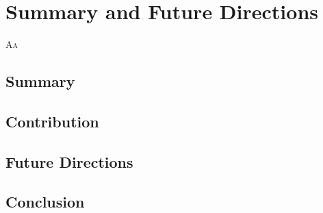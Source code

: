 
\chapter{\color{red}Summary and Future Directions}

\lettrine{A}{a}

\section{\color{red}Summary}


\section{\color{red}Contribution}


\section{\color{red}Future Directions}


\section{\color{red}Conclusion}

